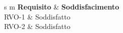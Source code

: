 
\begin{longtable}{s m}  
\endhead
\hline\hline
	\textbf{Requisito} & \textbf{Soddisfacimento}\\
\hline
	RVO-1 &
	Soddisfatto\\
\hline
	RVO-2 &
	Soddisfatto\\
\hline
\bottomrule
\caption{Tabella del soddisfacimento dei requisti di vincolo}
\end{longtable}
